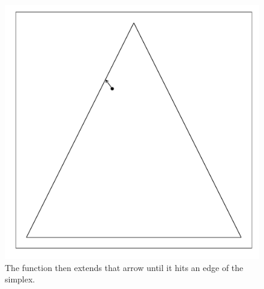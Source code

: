 \documentclass{article}\usepackage{graphicx, color}
\makeatletter
\def\maxwidth{ %
  \ifdim\Gin@nat@width>\linewidth
    \linewidth
  \else
    \Gin@nat@width
  \fi
}
\newenvironment{knitrout}{}{} %
\makeatother
\begin{document}
\begin{figure}[H]
\begin{knitrout}
\color{fgcolor}
\includegraphics[width=\maxwidth]{figure/hitandrun_walkthrough3} 

\end{knitrout}

\caption{The function then extends that arrow until it hits an edge of the simplex.}
\end{figure}
\end{document}
